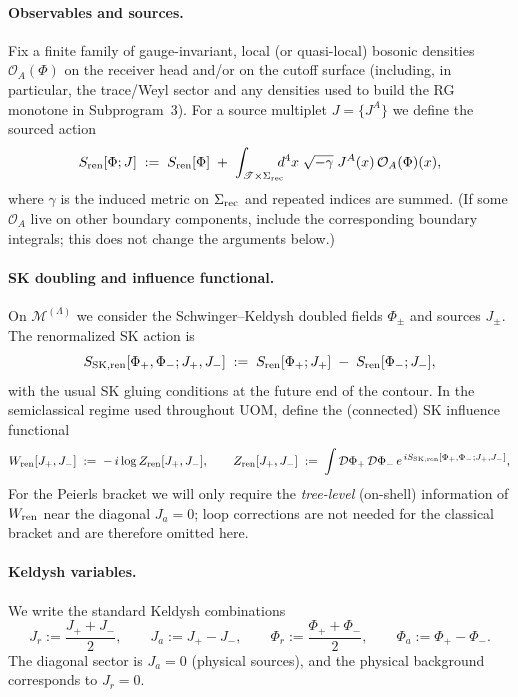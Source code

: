 \documentclass[10pt]{article}
\theoremstyle{definition}
\theoremstyle{plain}
\begin{document}
\paragraph{Observables and sources.}
Fix a finite family of gauge-invariant, local (or quasi-local) bosonic densities
$\mathcal O_A(\Phi)$ on the receiver head and/or on the cutoff surface (including, in particular, the trace/Weyl
sector and any densities used to build the RG monotone in Subprogram~3).
For a source multiplet $J=\{J^A\}$ we define the sourced action
\begin{equation}
S_{\rm ren}[\Phi;J]\;:=\;S_{\rm ren}[\Phi]\;+\;\int_{\mathscr T\times\Sigma_{\rm rec}}\!\!\!\! d^4x\;\sqrt{-\gamma}\;J^A(x)\,\mathcal O_A(\Phi)(x),
\label{eq:uom-sourced-action}
\end{equation}
where $\gamma$ is the induced metric on $\Sigma_{\rm rec}$ and repeated indices are summed.
(If some $\mathcal O_A$ live on other boundary components, include the corresponding boundary integrals; this
does not change the arguments below.)

\paragraph{SK doubling and influence functional.}
On $\mathcal M^{(\Lambda)}$ we consider the Schwinger--Keldysh doubled fields $\Phi_\pm$ and sources $J_\pm$.
The renormalized SK action is
\[
S_{\rm SK,ren}[\Phi_+,\Phi_-;J_+,J_-]
\;:=\;S_{\rm ren}[\Phi_+;J_+]\; -\; S_{\rm ren}[\Phi_-;J_-],
\]
with the usual SK gluing conditions at the future end of the contour.
In the semiclassical regime used throughout UOM, define the (connected) SK influence functional
\begin{equation}
W_{\rm ren}[J_+,J_-]\;:=\;-\,i\log Z_{\rm ren}[J_+,J_-],
\qquad
Z_{\rm ren}[J_+,J_-]\;:=\;\int\mathcal D\Phi_+\,\mathcal D\Phi_-\,e^{\,iS_{\rm SK,ren}[\Phi_+,\Phi_-;J_+,J_-]},
\label{eq:Wren-def}
\end{equation}
For the Peierls bracket we will only require the \emph{tree-level} (on-shell) information of $W_{\rm ren}$ near the
diagonal $J_a=0$; loop corrections are not needed for the classical bracket and are therefore omitted here.

\paragraph{Keldysh variables.}
We write the standard Keldysh combinations
\[
J_r:=\frac{J_++J_-}{2},\qquad J_a:=J_+-J_-,
\qquad
\Phi_r:=\frac{\Phi_++\Phi_-}{2},\qquad \Phi_a:=\Phi_+-\Phi_-.
\]
The diagonal sector is $J_a=0$ (physical sources), and the physical background corresponds to $J_r=0$.
\end{document}
